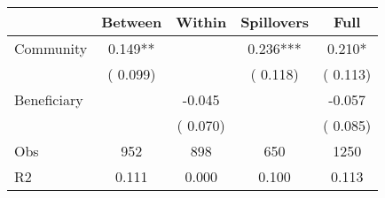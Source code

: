 
\begin{tabular}{l*{4}{c}}\hline&\multicolumn{1}{c}{Between}&\multicolumn{1}{c}{Within}&\multicolumn{1}{c}{Spillovers}&\multicolumn{1}{c}{Full}\\ \hline
 Community             &              0.149**      &                                               &        0.236*** &         0.210*                            \\ 
                               &        (       0.099)           &                                       &       (       0.118)     &      (       0.113)                                           \\ 
 Beneficiary   &                                               &       -0.045    &                                &            -0.057                            \\ 
                               &                                               & (       0.070)                  &                                        &      (       0.085)                                           \\ 
\hline                                                                                                                                                                                                                                            
 Obs                   &               952               &       898                       &       650                &              1250                                               \\ 
 R2                    &                      0.111              &              0.000                      &              0.100               &                     0.113                                              \\ 
\hline \end{tabular}                                                                                                                                                                                                              